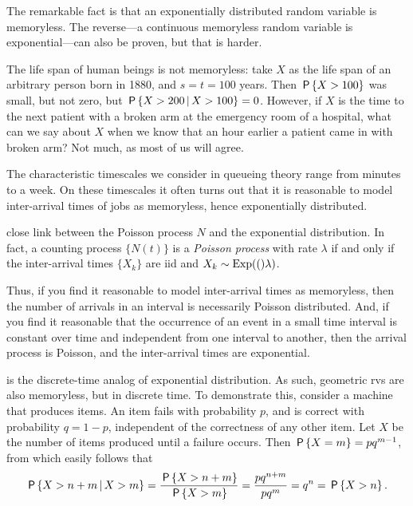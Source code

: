 The remarkable fact is that an exponentially distributed random variable is memoryless.
The reverse---a continuous memoryless random variable is exponential---can also be proven, but that is harder.

The life span of human beings is not memoryless: take $X$ as the life span of an arbitrary person born in 1880, and $s=t = 100$ years.
Then $\P{X>100}$ was small, but not zero, but $\P{X>200 \given X>100} = 0$.
However, if $X$ is the time to the next patient with a broken arm at the emergency room of a hospital, what can we say about $X$ when we know that an hour earlier a patient came in with broken arm?
Not much, as most of us will agree.

The characteristic timescales we consider in queueing theory range from minutes to a week.
On these timescales it often turns out that it is reasonable to model inter-arrival times of jobs as memoryless, hence exponentially distributed.


 close link between the Poisson process $N$ and the exponential distribution.
In fact, a counting process $\{N(t)\}$ is a \emph{Poisson process} with rate $\lambda$ if and only if the inter-arrival times $\{X_k\}$ are iid and $X_{k} \sim \Exp(\lambda)$.


Thus, if you find it reasonable to model inter-arrival times as memoryless, then the number of arrivals in an interval is necessarily Poisson distributed.
And, if you find it reasonable that the occurrence of an event in a small time interval is constant over time and independent from one interval to another, then the arrival process is Poisson, and the inter-arrival times are exponential.


 is the discrete-time analog of exponential distribution.
As such, geometric rvs are also memoryless, but in discrete time.
To demonstrate this, consider a machine that produces items.
An item fails with probability $p$, and is correct with probability $q=1-p$, independent of the correctness of any other item.
Let $X$ be the number of items produced until a failure occurs.  Then $\P{X=m} =  p q^{m-1}$, from which easily follows that
\begin{equation}  \label{eq:81}
\P{X>n+m\given X>m} = \frac{\P{X>n+m}}{\P{X>m}} = \frac{p q^{n+m}}{p q^m}=q^{n} = \P{X>n}.
\end{equation}



